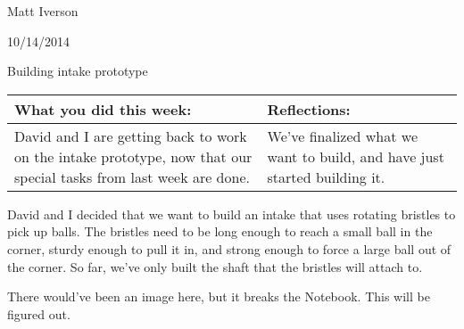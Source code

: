Matt Iverson

10/14/2014

Building intake prototype

\begin{tabular}{|p{5cm}|p{5cm}|}
 \hline
 What you did this week: &
 Reflections: \\
 \hline
 David and I are getting back to work on the intake prototype, now that our special tasks from last week are done. &
 We’ve finalized what we want to build, and have just started building it. \\
 \hline
\end{tabular}

David and I decided that we want to build an intake that uses rotating bristles to pick up balls. The bristles need to be long enough to reach a small ball in the corner, sturdy enough to pull it in, and strong enough to force a large ball out of the corner. So far, we’ve only built the shaft that the bristles will attach to.

There would've been an image here, but it breaks the Notebook. This will be figured out.
